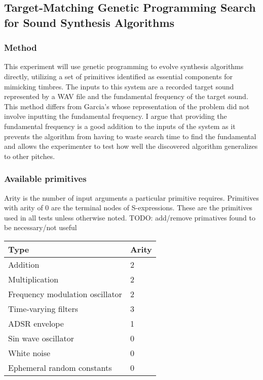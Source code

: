\documentclass[12pt]{article}
\begin{document}
\subsection{Target-Matching Genetic Programming Search for Sound Synthesis Algorithms}
\subsubsection{Method}
This experiment will use genetic programming to evolve synthesis algorithms directly, utilizing a set of primitives identified as essential components for mimicking timbres. The inputs to this system are a recorded target sound represented by a WAV file and the fundamental frequency of the target sound. This method differs from Garcia's whose representation of the problem did not involve inputting the fundamental frequency. I argue that providing the fundamental frequency is a good addition to the inputs of the system as it prevents the algorithm from having to waste search time to find the fundamental and allows the experimenter to test how well the discovered algorithm generalizes to other pitches.
\subsubsection{Available primitives}
Arity is the number of input arguments a particular primitive requires. Primitives with arity of $0$ are the terminal nodes of S-expressions. These are the primitives used in all tests unless otherwise noted. TODO: add/remove primatives found to be necessary/not useful
\begin{center}
\begin{tabular}{ | l | l | } \hline
Type & Arity \\ \hline
Addition & 2 \\ \hline
Multiplication & 2 \\ \hline
Frequency modulation oscillator & 2 \\ \hline
Time-varying filters & 3 \\ \hline
ADSR envelope & 1 \\ \hline
Sin wave oscillator & 0 \\ \hline
White noise & 0 \\ \hline
Ephemeral random constants & 0 \\ \hline
\end{tabular}
\end{center}
\end{document}
